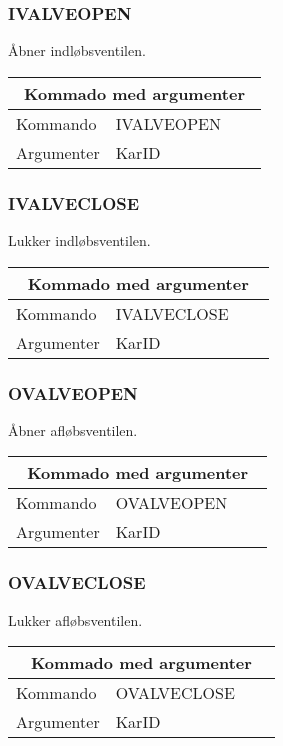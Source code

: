 \subsubsection{IVALVEOPEN}
Åbner indløbsventilen.

\begin{table}[H]
\setlength{\parindent}{12pt}
\begin{tabular}{|l|lcc|}
\hline
\multicolumn{4}{|c|}{Kommado med argumenter}\\\hline
Kommando & IVALVEOPEN & & \\
Argumenter & KarID & & \\\hline
\end{tabular}
\end{table}


\subsubsection{IVALVECLOSE}
Lukker indløbsventilen.

\begin{table}[H]
\setlength{\parindent}{12pt}
\begin{tabular}{|l|lcc|}
\hline
\multicolumn{4}{|c|}{Kommado med argumenter}\\\hline
Kommando & IVALVECLOSE & & \\
Argumenter & KarID & & \\\hline
\end{tabular}
\end{table}


\subsubsection{OVALVEOPEN}
Åbner afløbsventilen.

\begin{table}[H]
\setlength{\parindent}{12pt}
\begin{tabular}{|l|lcc|}
\hline
\multicolumn{4}{|c|}{Kommado med argumenter}\\\hline
Kommando & OVALVEOPEN & & \\
Argumenter & KarID & & \\\hline
\end{tabular}
\end{table}


\subsubsection{OVALVECLOSE}
Lukker afløbsventilen.

\begin{table}[H]
\setlength{\parindent}{12pt}
\begin{tabular}{|l|lcc|}
\hline
\multicolumn{4}{|c|}{Kommado med argumenter}\\\hline
Kommando & OVALVECLOSE & & \\
Argumenter & KarID & & \\\hline
\end{tabular}
\end{table}
